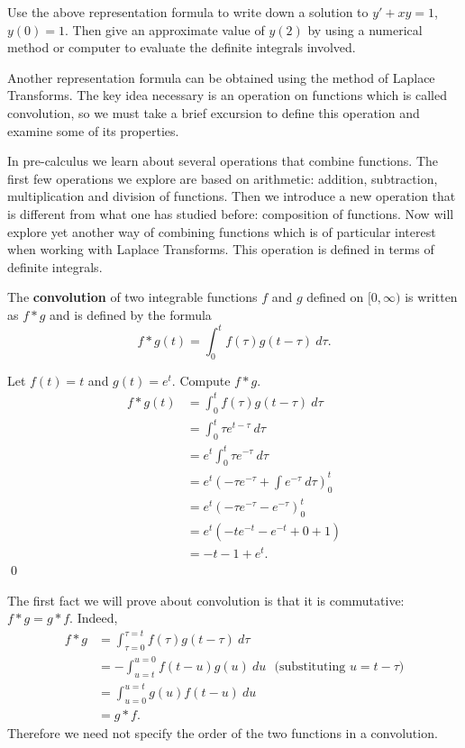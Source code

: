 {{\begin{exe} Use the above representation formula to write down a solution to $y'+xy=1$, $y(0)=1$.  Then give an approximate value of $y(2)$ by using a numerical method or computer to evaluate the definite integrals involved.
\end{exe}

Another representation formula can be obtained using the method of Laplace Transforms.  The key idea necessary is an operation on functions which is called convolution, so we must take a brief excursion to define this operation and examine some of its properties.

In pre-calculus we learn about several operations that combine functions.  The first few operations we explore are based on arithmetic: addition, subtraction, multiplication and division of functions.  Then we introduce a new operation that is different from what one has studied before: composition of functions.  Now will explore yet another way of combining functions which is of particular interest when working with Laplace Transforms.  This operation is defined in terms of definite integrals.

The 
	{\bf convolution} of two integrable functions $f$ and $g$ defined on $[0,\infty)$ is written as $f * g$ and is defined by the formula
\[ f*g (t) = \int_0^t f(\tau) g(t-\tau) \ d\tau.\]

\example Let $f(t)=t$ and $g(t)=e^t$.  Compute $f*g$.
\begin{align*}
f*g(t) & = \int_0^t f(\tau) g(t-\tau) \ d\tau \\
& = \int_0^t \tau e^{t-\tau} \ d\tau \\
& = e^t \int_0^t \tau e^{-\tau} \ d\tau \\
& = e^t \left( -\tau e^{-\tau} + \int e^{-\tau} \ d\tau \right)_0^t \\
& = e^t \left( -\tau e^{-\tau} -e^{-\tau} \right)_0^t \\
& = e^t(-t e^{-t} - e^{-t}+0+1) \\
& = -t-1+e^t.
\end{align*}
\qed

The first fact we will prove about convolution is that it is commutative: $f*g=g*f$.  Indeed,
\begin{align*}
f*g & = \int_{\tau=0}^{\tau=t} f(\tau)g(t-\tau) \ d\tau \\
& = -\int_{u=t}^{u=0} f(t-u)g(u) \ du \ \ \ \mbox{(substituting $u=t-\tau$)} \\
& = \int_{u=0}^{u=t}g(u)f(t-u) \ du \\
& = g*f.
\end{align*}
Therefore we need not specify the order of the two functions in a convolution.  

}}
